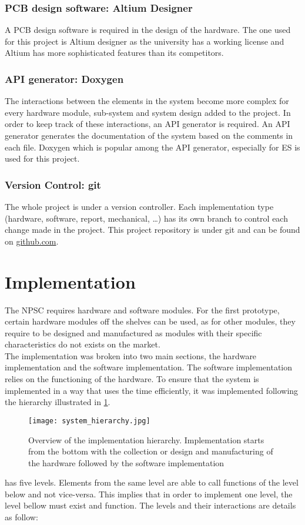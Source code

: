  \subsubsection{PCB design software: Altium Designer}
A PCB design software is required in the design of the hardware. The one used for this project is Altium designer as the university has a working license and Altium has more sophisticated features than its competitors. 
\subsubsection{API generator: Doxygen}
The interactions between the elements in the system become more complex for every hardware module, sub-system and system design added to the project. In order to keep track of these interactions, an API generator is required. An API generator generates the documentation of the system based on the comments in each file. Doxygen which is popular among the API generator, especially for ES is used for this project.
\subsubsection{Version Control: git}
The whole project is under a version controller. Each implementation type (hardware, software, report, mechanical, \ldots) has its own branch to control each change made in the project. This project repository is under git and can be found on \href{https://github.com/Kojey/NPSC}{github.com}. 
\section{Implementation}
The NPSC requires hardware and software modules. For the first prototype, certain hardware modules off the shelves can be used, as for other modules, they require to be designed and manufactured as modules with their specific characteristics do not exists on the market.\\
The implementation was broken into two main sections, the hardware implementation and the software implementation. The software implementation relies on the functioning of the hardware. To ensure that the system is implemented in a way that uses the time efficiently, it was implemented following the hierarchy illustrated in \cref{fig:system_hierarchy}. 
\begin{figure}[ht]
\centering
\texttt{[image: system\_hierarchy.jpg]}
\caption{Overview of the implementation hierarchy. Implementation starts from the bottom with the collection or design and manufacturing of the hardware followed by the software implementation}
\label{fig:system_hierarchy}
\end{figure}
 has five levels. Elements from the same level are able to call functions of the level below and not vice-versa. This implies that in order to implement one level, the level bellow must exist and function. The levels and their interactions are details as follow:
